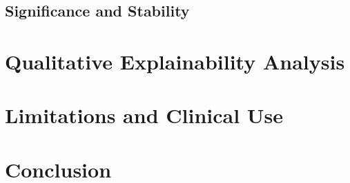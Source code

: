 \documentclass[11pt]{article}
\begin{document}
\subsection{Significance and Stability}

\section{Qualitative Explainability Analysis}

\section{Limitations and Clinical Use}

\section{Conclusion}
\end{document}
